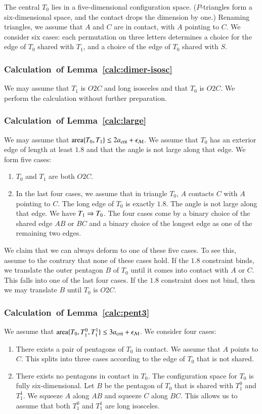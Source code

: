 The central $T_0$ lies in a five-dimensional configuration
space. ($P$-triangles form a six-dimensional space, and the contact
drops the dimension by one.)  Renaming triangles, we assume that $A$
and $C$ are in contact, with $A$ pointing to $C$.  We consider six
cases: each permutation on three letters determines a choice for the
edge of $T_0$ shared with $T_1$, and a choice of the edge of $T_0$
shared with $S$.

\subsubsection{Calculation~of Lemma~\ref{calc:dimer-isosc}}
We may assume that $T_1$ is $O2C$ and long isosceles and that $T_0$ is
$O2C$.  We perform the calculation without further preparation.

\subsubsection{Calculation~of Lemma~\ref{calc:large}} %
We may assume that ${\operatorname{area}}\{T_0,T_1\}\le 2a_\text{crit} + \epsilon_{\mathcal M}$.  We assume
that $T_0$ has an exterior edge of length at least $1.8$ and that the
angle is not large along that edge.  We form five cases:
\begin{enumerate}  
\item $T_0$ and $T_1$ are both $O2C$.
\item In the last four cases, we assume that in triangle $T_0$, $A$
  contacts $C$ with $A$ pointing to $C$.  The long edge of $T_0$ is
  exactly $1.8$.  The angle is not large along that edge.  We have
  $T_1\Rightarrow T_0$.  The four cases come by a binary choice of the shared
  edge $AB$ or $BC$ and a binary choice of the longest edge as one of
  the remaining two edges.
\end{enumerate}

We claim that we can always deform to one of these five cases.  To see
this, assume to the contrary that none of these cases hold.  If the
$1.8$ constraint binds, we translate the outer pentagon $B$ of $T_0$
until it comes into contact with $A$ or $C$. This falls into one of
the last four cases.  If the $1.8$ constraint does not bind, then we
may translate $B$ until $T_0$ is $O2C$.

\subsubsection{Calculation~of Lemma~\ref{calc:pent3}} %
We assume that ${\operatorname{area}}\{T_0,T_1^0,T_1^1\}\le 3a_\text{crit} + \epsilon_{\mathcal M}$.  We
consider four cases:
\begin{enumerate}  
\item There exists a pair of pentagons of $T_0$ in contact.  We assume
  that $A$ points to $C$.  This splits into three cases according to
  the edge of $T_0$ that is not shared.
\item There exists no pentagons in contact in $T_0$.  The
  configuration space for $T_0$ is fully six-dimensional.  Let $B$ be
  the pentagon of $T_0$ that is shared with $T_1^0$ and $T_1^1$.  We
  squeeze $A$ along $AB$ and squeeze $C$ along $BC$.  This allows us
  to assume that both $T_1^0$ and $T_1^1$ are long isosceles.
\end{enumerate}  

